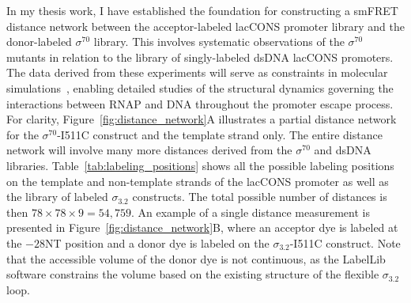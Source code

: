 In my thesis work, I have established the foundation for constructing a \ac{smFRET} distance network between the acceptor-labeled \ac{lacCONS} promoter library and the donor-labeled $\sigma^{70}$ library. 
This involves systematic observations of the $\sigma^{70}$ mutants in relation to the library of singly-labeled \ac{dsDNA} \ac{lacCONS} promoters. 
The data derived from these experiments will serve as constraints in molecular simulations~\cite{dimura_COSB_2016}, enabling detailed studies of the structural dynamics governing the interactions between \ac{RNAP} and DNA throughout the promoter escape process.
For clarity, Figure~\ref{fig:distance_network}A illustrates a partial distance network for the $\sigma^{70}$-I511C construct and the template strand only. 
The entire distance network will involve many more distances derived from the $\sigma^{70}$ and \ac{dsDNA} libraries.
Table~\ref{tab:labeling_positions} shows all the possible labeling positions on the template and non-template strands of the \ac{lacCONS} promoter as well as the library of labeled $\sigma_{3.2}$ constructs.
The total possible number of distances is then $78 \times 78 \times 9 = 54,759$.
An example of a single distance measurement is presented in Figure~\ref{fig:distance_network}B, where an acceptor dye is labeled at the $-28$NT position and a donor dye is labeled on the $\sigma_{3.2}$-I511C construct. 
Note that the accessible volume of the donor dye is not continuous, as the LabelLib software constrains the volume based on the existing structure of the flexible $\sigma_{3.2}$ loop. 

